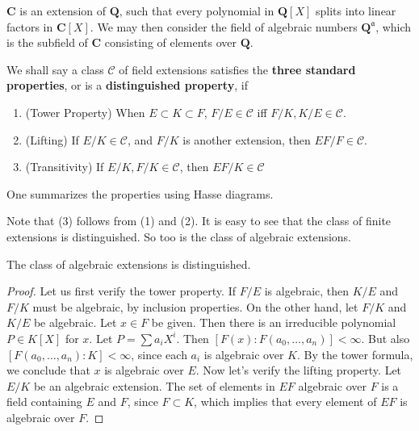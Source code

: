 \begin{example}
    $\mathbf{C}$ is an extension of $\mathbf{Q}$, such that every polynomial in $\mathbf{Q}[X]$ splits into linear factors in $\mathbf{C}[X]$. We may then consider the field of algebraic numbers $\mathbf{Q}^{\mathfrak{a}}$, which is the subfield of $\mathbf{C}$ consisting of elements over $\mathbf{Q}$.
\end{example}

We shall say a class $\mathcal{C}$ of field extensions satisfies the {\bf three standard properties}, or is a {\bf distinguished property}, if
%
\begin{enumerate}
    \item (Tower Property) When $E \subset K \subset F$, $F/E \in \mathcal{C}$ iff $F/K,K/E \in \mathcal{C}$.
    \item (Lifting) If $E/K \in \mathcal{C}$, and $F/K$ is another extension, then $EF/F \in \mathcal{C}$.
    \item (Transitivity) If $E/K, F/K \in \mathcal{C}$, then $EF/K \in \mathcal{C}$
\end{enumerate}
%
One summarizes the properties using Hasse diagrams.
%
\begin{center}
\end{center}
%
Note that (3) follows from (1) and (2). It is easy to see that the class of finite extensions is distinguished. So too is the class of algebraic extensions.

\begin{theorem}
    The class of algebraic extensions is distinguished.
\end{theorem}
\begin{proof}
    Let us first verify the tower property. If $F/E$ is algebraic, then $K/E$ and $F/K$ must be algebraic, by inclusion properties. On the other hand, let $F/K$ and $K/E$ be algebraic. Let $x \in F$ be given. Then there is an irreducible polynomial $P \in K[X]$ for $x$. Let $P = \sum a_i X^i$. Then $[F(x): F(a_0, \dots, a_n)] < \infty$. But also $[F(a_0, \dots, a_n): K] < \infty$, since each $a_i$ is algebraic over $K$. By the tower formula, we conclude that $x$ is algebraic over $E$. Now let's verify the lifting property. Let $E/K$ be an algebraic extension. The set of elements in $EF$ algebraic over $F$ is a field containing $E$ and $F$, since $F \subset K$, which implies that every element of $EF$ is algebraic over $F$.
\end{proof}

